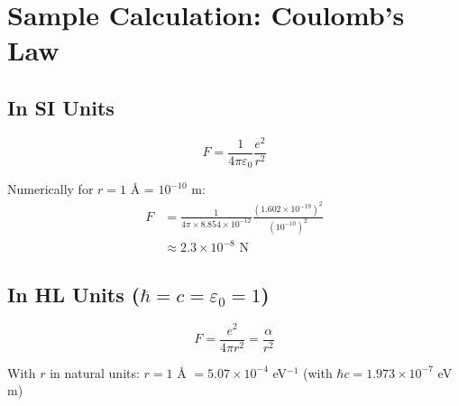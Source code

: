 	\begin{table}[h]
		\centering
		\caption{Conversion table SI to HL}
	\end{table}
	
	\section{Sample Calculation: Coulomb's Law}
	
	\subsection{In SI Units}
	
	\begin{equation}
		F = \frac{1}{4\pi\varepsilon_0} \frac{e^2}{r^2}
	\end{equation}
	
	Numerically for $r = 1$ Å = $10^{-10}$ m:
	\begin{align}
		F &= \frac{1}{4\pi \times 8.854 \times 10^{-12}} \frac{(1.602 \times 10^{-19})^2}{(10^{-10})^2} \\
		&\approx 2.3 \times 10^{-8} \text{ N}
	\end{align}
	
	\subsection{In HL Units ($\hbar = c = \varepsilon_0 = 1$)}
	
	\begin{equation}
		F = \frac{e^2}{4\pi r^2} = \frac{\alpha}{r^2}
	\end{equation}
	
	With $r$ in natural units: $r = 1$ Å $= 5.07 \times 10^{-4}$ eV$^{-1}$ (with $\hbar c = 1.973 \times 10^{-7}$ eV\,m)
	

